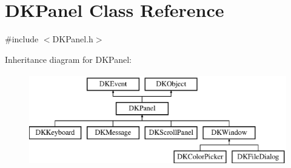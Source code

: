 \hypertarget{class_d_k_panel}{\section{D\-K\-Panel Class Reference}
\label{class_d_k_panel}
}


{\ttfamily \#include $<$D\-K\-Panel.\-h$>$}

Inheritance diagram for D\-K\-Panel\-:\begin{figure}[H]
\begin{center}
\leavevmode
\includegraphics[height=4.000000cm]{class_d_k_panel}
\end{center}
\end{figure}
